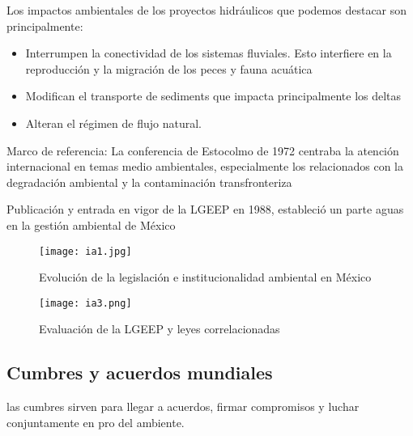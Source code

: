 Los impactos ambientales de los proyectos hidráulicos que podemos destacar son principalmente:
\begin{itemize}
    \item Interrumpen la conectividad de los sistemas fluviales. Esto interfiere en la reproducción y la migración de los peces y fauna acuática
    \item Modifican el transporte de sediments que impacta principalmente los deltas
    \item Alteran el régimen de flujo natural.
\end{itemize}
Marco de referencia: La conferencia de Estocolmo de 1972 centraba la atención internacional en temas medio ambientales, especialmente los relacionados con la degradación ambiental y la contaminación transfronteriza

Publicación y entrada en vigor de la LGEEP en 1988, estableció un parte aguas en la gestión ambiental de México
\begin{figure}[h!]
\centering
  \texttt{[image: ia1.jpg]}    
  \caption{Evolución de la legislación e institucionalidad ambiental en México}
  \label{ia1}
\end{figure}
\begin{figure}[h!]
\centering
  \texttt{[image: ia3.png]}
  \caption{Evaluación de la LGEEP y leyes correlacionadas}
  \label{ie3}
\end{figure}
\subsection{Cumbres y acuerdos mundiales}
las cumbres sirven para llegar a acuerdos, firmar compromisos y luchar conjuntamente en pro del ambiente.

